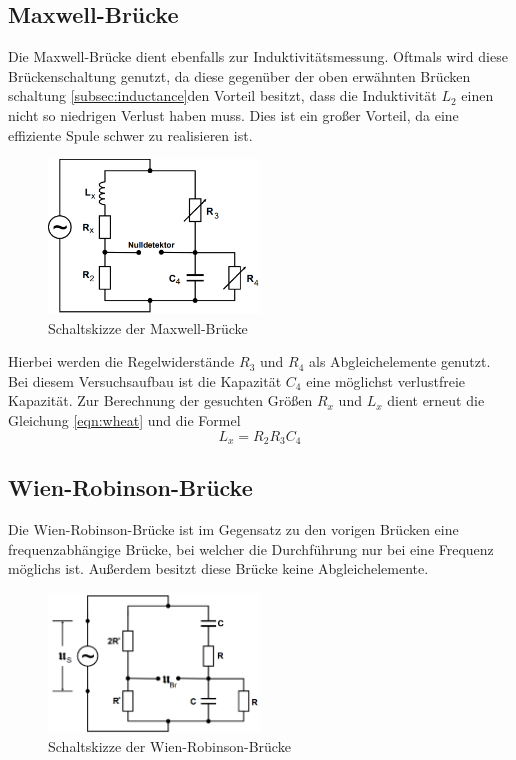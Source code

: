 \subsection{Maxwell-Brücke}
Die Maxwell-Brücke dient ebenfalls zur Induktivitätsmessung. Oftmals wird diese Brückenschaltung genutzt, da diese gegenüber der oben erwähnten Brücken
schaltung \ref{subsec:inductance}den Vorteil besitzt, dass die Induktivität $L_2$ einen nicht so niedrigen Verlust haben muss. Dies ist ein großer Vorteil, da eine 
effiziente Spule schwer zu realisieren ist.
\begin{figure}
    \centering
    \caption{Schaltskizze der Maxwell-Brücke}
    \label{fig:maxwell}
    \includegraphics[width=0.5\textwidth]{bridges/maxwell.png}
\end{figure}
Hierbei werden die Regelwiderstände $R_3$ und $R_4$ als Abgleichelemente genutzt. Bei diesem Versuchsaufbau ist die Kapazität $C_4$ eine möglichst verlustfreie 
Kapazität. Zur Berechnung der gesuchten Größen $R_x$ und $L_x$ dient erneut die Gleichung \eqref{eqn:wheat} und die Formel
\begin{equation}
    L_x = R_2 R_3 C_4
\end{equation}
\subsection{Wien-Robinson-Brücke}
Die Wien-Robinson-Brücke ist im Gegensatz zu den vorigen Brücken eine frequenzabhängige Brücke, bei welcher die Durchführung nur bei eine Frequenz möglichs ist.
Außerdem besitzt diese Brücke keine Abgleichelemente.
\begin{figure}
    \centering
    \caption{Schaltskizze der Wien-Robinson-Brücke}
    \label{fig:WR}
    \includegraphics[width=0.5\textwidth]{bridges/WR.png}
\end{figure}
